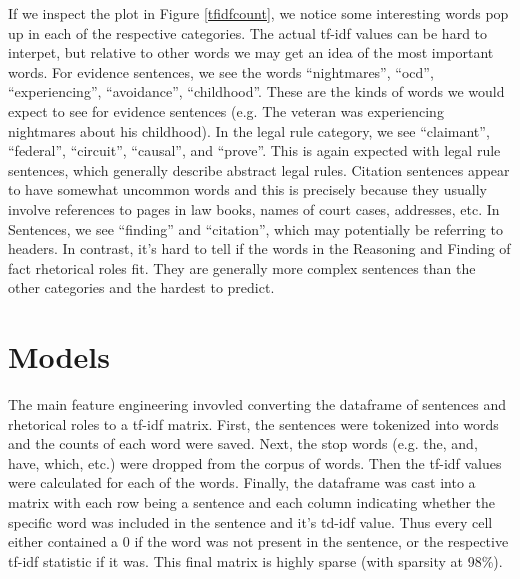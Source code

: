\documentclass[11pt]{article}
\begin{document}
If we inspect the plot in Figure \ref{tfidfcount}, we notice some interesting words pop up in each of the respective categories. The actual tf-idf values can be hard to interpet, but relative to other words we may get an idea of the most important words. For evidence sentences, we see the words ``nightmares'', ``ocd'', ``experiencing'', ``avoidance'', ``childhood''. These are the kinds of words we would expect to see for evidence sentences (e.g. The veteran was experiencing nightmares about his childhood). In the legal rule category, we see ``claimant'', ``federal'', ``circuit'', ``causal'', and ``prove''. This is again expected with legal rule sentences, which generally describe abstract legal rules. Citation sentences appear to have somewhat uncommon words and this is precisely because they usually involve references to pages in law books, names of court cases, addresses, etc. In Sentences, we see ``finding'' and ``citation'', which may potentially be referring to headers. In contrast, it's hard to tell if the words in the Reasoning and Finding of fact rhetorical roles fit. They are generally more complex sentences than the other categories and the hardest to predict.

\section*{Models}

The main feature engineering invovled converting the dataframe of sentences and rhetorical roles to a tf-idf matrix. First, the sentences were tokenized into words and the counts of each word were saved. Next, the stop words (e.g. the, and, have, which, etc.) were dropped from the corpus of words. Then the tf-idf values were calculated for each of the words. Finally, the dataframe was cast into a matrix with each row being a sentence and each column indicating whether the specific word was included in the sentence and it's td-idf value. Thus every cell either contained a 0 if the word was not present in the sentence, or the respective tf-idf statistic if it was. This final matrix is highly sparse (with sparsity at 98\%).
\end{document}
